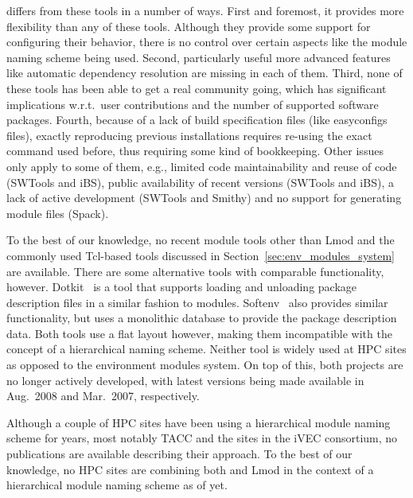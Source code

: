 \easybuild{} differs from these tools in a number of ways. First and foremost, it
provides more flexibility than any of these tools. Although they provide some support
for configuring their behavior, there is no control over certain aspects like the
module naming scheme being used. Second, particularly useful more advanced
features like automatic dependency resolution are missing in each of them. Third, 
none of these tools has been able to get a real community going, which
has significant implications w.r.t.\ user contributions and the number of supported
software packages. Fourth, because of a lack of build specification files (like
easyconfigs files), exactly reproducing previous installations requires
re-using the exact command used before, thus requiring some kind of bookkeeping.
Other issues only apply to some of them, e.g., limited code
maintainability and reuse of code (SWTools and iBS), public availability of recent
versions (SWTools and iBS), a lack of active development (SWTools and Smithy) and
no support for generating module files (Spack).

To the best of our knowledge, no recent module tools other than Lmod and the commonly
used Tcl-based tools discussed in Section~\ref{sec:env_modules_system} are
available. There are some alternative tools with comparable functionality, however.
Dotkit~\cite{dotkit} is a tool that supports loading and unloading package description 
files in a similar fashion to modules. Softenv~\cite{softenv} also provides similar
functionality, but uses a monolithic database to provide the package description data.
Both tools use a flat layout however, making them incompatible with the concept of a
hierarchical naming scheme. Neither tool is widely used at HPC sites as
opposed to the environment modules system. On top of this, both projects are no longer
actively developed, with latest versions being made available in Aug.~2008 and
Mar.~2007, respectively.

Although a couple of HPC sites have been using a hierarchical module naming scheme
for years, most notably TACC and the sites in the iVEC consortium, no publications
are available describing their approach. To the best of our knowledge, no HPC sites
are combining both \easybuild{} and Lmod in the context of a hierarchical module
naming scheme as of yet.

